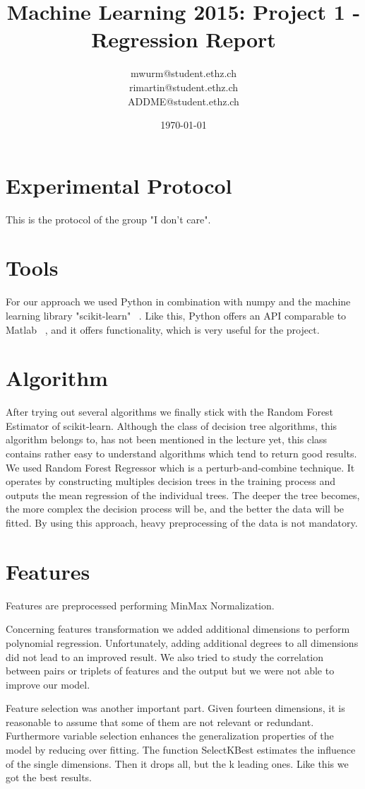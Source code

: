 \documentclass[a4paper, 11pt]{article}
\title{Machine Learning 2015: Project 1 - Regression Report}
\author{mwurm@student.ethz.ch\\ rimartin@student.ethz.ch\\ ADDME@student.ethz.ch\\}
\date{\today}
\begin{document}
\maketitle

\section*{Experimental Protocol}
This is the protocol of the group "I don't care".

\section{Tools}
For our approach we used Python in combination with numpy and the machine learning library "scikit-learn" ~\cite{scikit}. Like this, Python offers an API comparable to Matlab ~\cite{matlab}, and it offers functionality, which is very useful for the project.

\section{Algorithm}
After trying out several algorithms we finally stick with the Random Forest Estimator of scikit-learn. Although the class of decision tree algorithms, this algorithm belongs to, has not been mentioned in the lecture yet, this class contains rather easy to understand algorithms which tend to return good results.
We used Random Forest Regressor which is a perturb-and-combine technique. It operates by constructing multiples decision trees in the training process and outputs the mean regression of the individual trees.
The deeper the tree becomes, the more complex the decision process will be, and the better the data will be fitted. By using this approach, heavy preprocessing of the data is not mandatory.

\section{Features}
Features are preprocessed performing MinMax Normalization.

Concerning features transformation we added additional dimensions to perform polynomial regression. Unfortunately, adding additional degrees to all dimensions did not lead to an improved result. We also tried to study the correlation between pairs or triplets of features and the output but we were not able to improve our model.

Feature selection was another important part. Given fourteen dimensions, it is reasonable to assume that some of them are not relevant or redundant. Furthermore variable selection enhances the generalization properties of the model by reducing over fitting. The function SelectKBest estimates the influence of the single dimensions. Then it drops all, but the k leading ones. Like this we got the best results.
\end{document}

